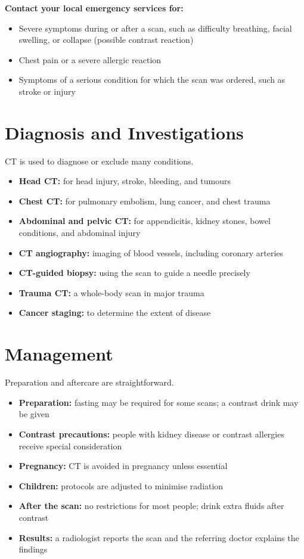 \textbf{Contact your local emergency services for:}
\begin{itemize}
    \item Severe symptoms during or after a scan, such as difficulty breathing, facial swelling, or collapse (possible contrast reaction)
    \item Chest pain or a severe allergic reaction
    \item Symptoms of a serious condition for which the scan was ordered, such as stroke or injury
\end{itemize}

\section*{Diagnosis and Investigations}
CT is used to diagnose or exclude many conditions.

\begin{itemize}
    \item \textbf{Head CT:} for head injury, stroke, bleeding, and tumours
    \item \textbf{Chest CT:} for pulmonary embolism, lung cancer, and chest trauma
    \item \textbf{Abdominal and pelvic CT:} for appendicitis, kidney stones, bowel conditions, and abdominal injury
    \item \textbf{CT angiography:} imaging of blood vessels, including coronary arteries
    \item \textbf{CT-guided biopsy:} using the scan to guide a needle precisely
    \item \textbf{Trauma CT:} a whole-body scan in major trauma
    \item \textbf{Cancer staging:} to determine the extent of disease
\end{itemize}

\section*{Management}
Preparation and aftercare are straightforward.

\begin{itemize}
    \item \textbf{Preparation:} fasting may be required for some scans; a contrast drink may be given
    \item \textbf{Contrast precautions:} people with kidney disease or contrast allergies receive special consideration
    \item \textbf{Pregnancy:} CT is avoided in pregnancy unless essential
    \item \textbf{Children:} protocols are adjusted to minimise radiation
    \item \textbf{After the scan:} no restrictions for most people; drink extra fluids after contrast
    \item \textbf{Results:} a radiologist reports the scan and the referring doctor explains the findings
\end{itemize}


